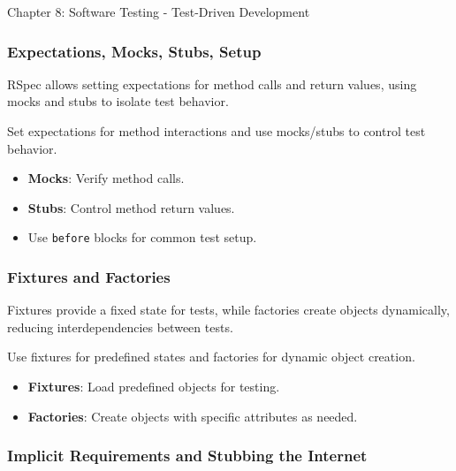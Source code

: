 \begin{notes}{Chapter 8: Software Testing - Test-Driven Development}
    \subsubsection*{Expectations, Mocks, Stubs, Setup}
    
    RSpec allows setting expectations for method calls and return values, using mocks and stubs to isolate test behavior.
    
    \begin{highlight}
    
        Set expectations for method interactions and use mocks/stubs to control test behavior.
        
        \begin{itemize}
            \item \textbf{Mocks}: Verify method calls.
            \item \textbf{Stubs}: Control method return values.
            \item Use \texttt{before} blocks for common test setup.
        \end{itemize}
    
    \end{highlight}
    
    \subsubsection*{Fixtures and Factories}
    
    Fixtures provide a fixed state for tests, while factories create objects dynamically, reducing interdependencies between tests.
    
    \begin{highlight}
    
        Use fixtures for predefined states and factories for dynamic object creation.
        
        \begin{itemize}
            \item \textbf{Fixtures}: Load predefined objects for testing.
            \item \textbf{Factories}: Create objects with specific attributes as needed.
        \end{itemize}
    
    \end{highlight}
    
    \subsubsection*{Implicit Requirements and Stubbing the Internet}
    

\end{notes}
